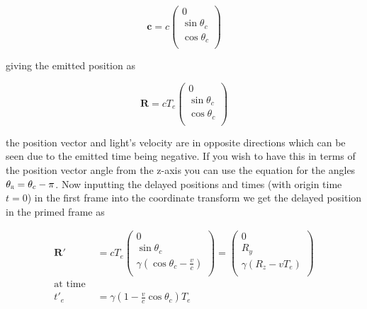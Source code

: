 \begin{equation}
	\mathbf{c} = c
	\begin{pmatrix}
		0              \\
		\sin{\theta_c} \\
		\cos{\theta_c} \\
	\end{pmatrix}
\end{equation}

giving the emitted position as

\begin{equation}
	\mathbf{R} = c {T}_{e}
	\begin{pmatrix}
		0              \\
		\sin{\theta_c} \\
		\cos{\theta_c} \\
	\end{pmatrix}
\end{equation}

the position vector and light's velocity are in opposite directions which can be seen due to the emitted time being negative. If you wish to have this in terms of the position vector angle from the z-axis you can use the equation for the angles $\theta_{\scalebox{0.5}{R}} = \theta_c - \pi$. Now inputting the delayed positions and times (with origin time $t=0$) in the first frame into the coordinate transform we get the delayed position in the primed frame as

\begin{equation}
	\begin{aligned}
		\mathbf{R}{'}     & = c{T}_{e}
		\begin{pmatrix}
			0                                                    \\
			\sin{\theta_c}                                       \\
			{\gamma} \left( \cos{\theta_c} - \frac{v}{c} \right) \\
		\end{pmatrix}
		=
		\begin{pmatrix}
			0                                    \\
			{{R}_{y}}                                  \\
			{\gamma} \left( {{R}_{z}} - {v} {{T}_{e}} \right) \\
		\end{pmatrix}
		\\
		\text{at time } &
		\\ {{t}{'}_{e}} & = {\gamma} (1-\frac{v}{c} \cos{\theta_{c}} ) {{T}_{e}}
	\end{aligned}
\end{equation}

